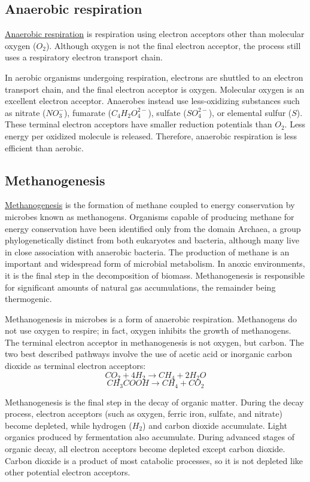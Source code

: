 \documentclass{article}
\begin{document}
\subsection{Anaerobic respiration}
\href{https://en.wikipedia.org/wiki/Anaerobic_respiration}{Anaerobic respiration} is
respiration using electron acceptors other than molecular oxygen ($O_2$). Although oxygen
is not the final electron acceptor, the process still uses a respiratory electron
transport chain.

In aerobic organisms undergoing respiration, electrons are shuttled to an electron
transport chain, and the final electron acceptor is oxygen. Molecular oxygen is an
excellent electron acceptor. Anaerobes instead use less-oxidizing substances such as
nitrate ($NO_3^-$), fumarate ($C_4H_2O_4^{2-}$), sulfate ($SO_4^{2-}$), or elemental
sulfur ($S$). These terminal electron acceptors have smaller reduction potentials than
$O_2$.  Less energy per oxidized molecule is released. Therefore, anaerobic respiration is
less efficient than aerobic.

\subsection{Methanogenesis}
\href{https://en.wikipedia.org/wiki/Methanogenesis}{Methanogenesis}
is the formation of methane coupled to energy conservation by microbes known as
methanogens. Organisms capable of producing methane for energy conservation have been
identified only from the domain Archaea, a group phylogenetically distinct from both
eukaryotes and bacteria, although many live in close association with anaerobic bacteria.
The production of methane is an important and widespread form of microbial metabolism. In
anoxic environments, it is the final step in the decomposition of biomass. Methanogenesis
is responsible for significant amounts of natural gas accumulations, the remainder being
thermogenic.

Methanogenesis in microbes is a form of anaerobic respiration. Methanogens do not use
oxygen to respire; in fact, oxygen inhibits the growth of methanogens. The terminal
electron acceptor in methanogenesis is not oxygen, but carbon. The two best described
pathways involve the use of acetic acid or inorganic carbon dioxide as terminal electron
acceptors:
\[
    CO_2 + 4 H_2 \rightarrow CH_4 + 2 H_2O
\]
\[
    CH_3COOH \rightarrow CH_4 + CO_2
\]

Methanogenesis is the final step in the decay of organic matter. During the decay process,
electron acceptors (such as oxygen, ferric iron, sulfate, and nitrate) become depleted,
while hydrogen ($H_2$) and carbon dioxide accumulate. Light organics produced by fermentation
also accumulate. During advanced stages of organic decay, all electron acceptors become
depleted except carbon dioxide. Carbon dioxide is a product of most catabolic processes,
so it is not depleted like other potential electron acceptors.
\end{document}
